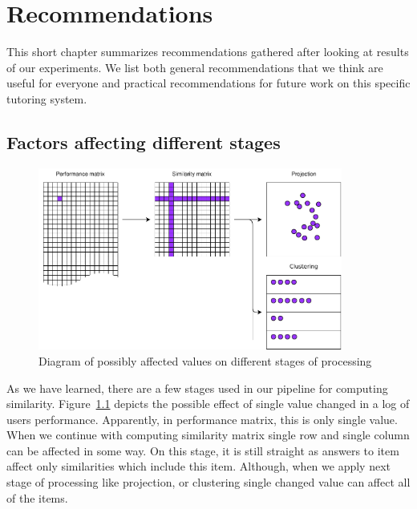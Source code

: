 \documentclass[
  print, %
  table,   %
  nolof,     %
  nolot,     %
  nocover,
  color,
  final,
]{fithesis3}
\begin{document}

\chapter{Recommendations}\label{recommendations}


This short chapter summarizes recommendations gathered after looking at results of our experiments. We list both general recommendations that we think are useful for everyone and practical recommendations for future work on this specific tutoring system.


\section{Factors affecting different stages}\label{factors-affecting-different-stages}

\begin{figure}
  \includegraphics[width=10cm]{img/affected_diagram}
  \caption{Diagram of possibly affected values on different stages of processing}
  \label{fig:affected_diagram}
\end{figure}


As we have learned, there are a few stages used in our pipeline for computing similarity. Figure~\ref{fig:affected_diagram} depicts the possible effect of single value changed in a log of users performance. Apparently, in performance matrix, this is only single value. When we continue with computing similarity matrix single row and single column can be affected in some way. On this stage, it is still straight as answers to item affect only similarities which include this item. Although, when we apply next stage of processing like projection, or clustering single changed value can affect all of the items.
\end{document}
